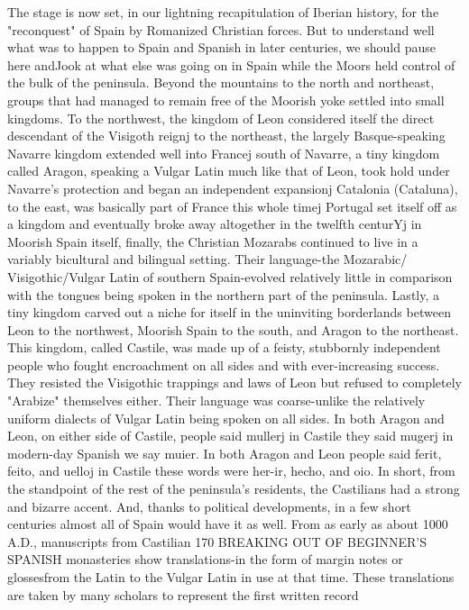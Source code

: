 The stage is now set, in our lightning recapitulation of Iberian
history, for the "reconquest" of Spain by Romanized Christian forces.
But to understand well what was to happen to Spain and Spanish in
later centuries, we should pause here andJook at what else was going
on in Spain while the Moors held control of the bulk of the peninsula.
Beyond the mountains to the north and northeast, groups that
had managed to remain free of the Moorish yoke settled into small
kingdoms. To the northwest, the kingdom of Leon considered itself the
direct descendant of the Visigoth reignj to the northeast, the largely
Basque-speaking Navarre kingdom extended well into Francej south of
Navarre, a tiny kingdom called Aragon, speaking a Vulgar Latin much
like that of Leon, took hold under Navarre's protection and began an
independent expansionj Catalonia (Cataluna), to the east, was basically
part of France this whole timej Portugal set itself off as a kingdom and
eventually broke away altogether in the twelfth centurYj in Moorish
Spain itself, finally, the Christian Mozarabs continued to live in a variably bicultural and bilingual setting. Their language-the Mozarabic/
Visigothic/Vulgar Latin of southern Spain-evolved relatively little in
comparison with the tongues being spoken in the northern part of the
peninsula.
Lastly, a tiny kingdom carved out a niche for itself in the uninviting borderlands between Leon to the northwest, Moorish Spain to
the south, and Aragon to the northeast. This kingdom, called Castile,
was made up of a feisty, stubbornly independent people who fought
encroachment on all sides and with ever-increasing success. They resisted the Visigothic trappings and laws of Leon but refused to completely "Arabize" themselves either. Their language was coarse-unlike the relatively uniform dialects of Vulgar Latin being spoken on all
sides. In both Aragon and Leon, on either side of Castile, people said
mullerj in Castile they said mugerj in modern-day Spanish we say
muier. In both Aragon and Leon people said ferit, feito, and uelloj in
Castile these words were her-ir, hecho, and oio. In short, from the
standpoint of the rest of the peninsula's residents, the Castilians had
a strong and bizarre accent. And, thanks to political developments, in
a few short centuries almost all of Spain would have it as well.
From as early as about 1000 A.D., manuscripts from Castilian
170 BREAKING OUT OF BEGINNER'S SPANISH
monasteries show translations-in the form of margin notes or glossesfrom the Latin to the Vulgar Latin in use at that time. These translations are taken by many scholars to represent the first written record
